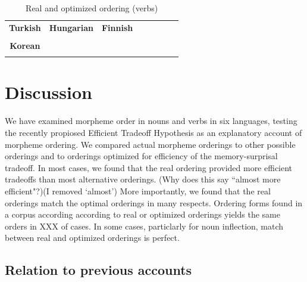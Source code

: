 \documentclass[11pt,letterpaper]{article}
\newcommand\mhahn[1]{{\color{red}(#1)}}
\newcommand\becky[1]{{\color{blue}(#1)}}
\begin{document}
\begin{table}[]

\begin{tabular}{cccccccc}
\textbf{Turkish} & \textbf{Hungarian} & \textbf{Finnish} \\
\begin{minipage}{.3\textwidth}
  
  \end{minipage}
  &
  \begin{minipage}{.3\textwidth}
  
  \end{minipage}
  &
    \begin{minipage}{.3\textwidth}
  
  \end{minipage}
  \\
  \textbf{Korean} \\
      \begin{minipage}{.3\textwidth}
  
  \end{minipage}
  \end{tabular}
  
  
    \caption{Real and optimized ordering (verbs)}
    \label{tab:my_label}
\end{table}



\section{Discussion}

We have examined morpheme order in nouns and verbs in six languages, testing the recently propiosed Efficient Tradeoff Hypothesis \citep{hahn2020modeling} as an explanatory account of morpheme ordering.
We compared actual morpheme orderings to other possible orderings and to orderings optimized for efficiency of the memory-surprisal tradeoff.
In most cases, we found that the real ordering provided more efficient tradeoffs than most alternative orderings. \becky{Why does this say ``almost more efficient"?}\mhahn{I removed `almost'}
More importantly, we found that the real orderings match the optimal orderings in many respects.
Ordering forms found in a corpus according according to real or optimized orderings yields the same orders in XXX of cases.
In some cases, particlarly for noun inflection, match between real and optimized orderings is perfect.

\subsection{Relation to previous accounts}
\end{document}
